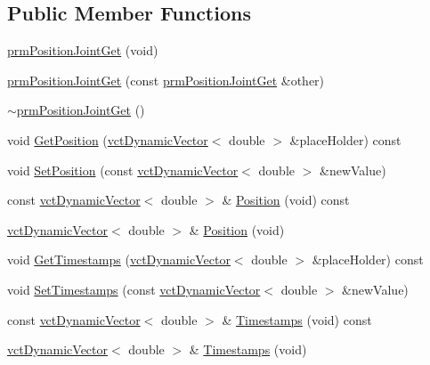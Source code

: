 \subsection*{Public Member Functions}
\begin{DoxyCompactItemize}
\item 
\hyperlink{classprm_position_joint_get_a69350009ebaba3339c0ec32b3aae6b7f}{prm\+Position\+Joint\+Get} (void)
\item 
\hyperlink{classprm_position_joint_get_a72c1c1f68659da9dbe32b7127515454e}{prm\+Position\+Joint\+Get} (const \hyperlink{classprm_position_joint_get}{prm\+Position\+Joint\+Get} \&other)
\item 
\hyperlink{classprm_position_joint_get_aabb4b6e77618eeab9dbf6d99fcae03ff}{$\sim$prm\+Position\+Joint\+Get} ()
\item 
void \hyperlink{classprm_position_joint_get_a83e71431f7e086cff80c7d905b734ada}{Get\+Position} (\hyperlink{classvct_dynamic_vector}{vct\+Dynamic\+Vector}$<$ double $>$ \&place\+Holder) const 
\item 
void \hyperlink{classprm_position_joint_get_a97b3fa06196951db95c14f397d05bc45}{Set\+Position} (const \hyperlink{classvct_dynamic_vector}{vct\+Dynamic\+Vector}$<$ double $>$ \&new\+Value)
\item 
const \hyperlink{classvct_dynamic_vector}{vct\+Dynamic\+Vector}$<$ double $>$ \& \hyperlink{classprm_position_joint_get_afc1c32503dade0821a035a42bf516f46}{Position} (void) const 
\item 
\hyperlink{classvct_dynamic_vector}{vct\+Dynamic\+Vector}$<$ double $>$ \& \hyperlink{classprm_position_joint_get_ae843013936bd6ceb74be7e5bda222f45}{Position} (void)
\item 
void \hyperlink{classprm_position_joint_get_a93c87fa32a3a893941b6943f399de3c9}{Get\+Timestamps} (\hyperlink{classvct_dynamic_vector}{vct\+Dynamic\+Vector}$<$ double $>$ \&place\+Holder) const 
\item 
void \hyperlink{classprm_position_joint_get_a59fbbf80a182141a7e74d509a7e06d00}{Set\+Timestamps} (const \hyperlink{classvct_dynamic_vector}{vct\+Dynamic\+Vector}$<$ double $>$ \&new\+Value)
\item 
const \hyperlink{classvct_dynamic_vector}{vct\+Dynamic\+Vector}$<$ double $>$ \& \hyperlink{classprm_position_joint_get_a90c9b7024463a9d8d53c183bd79c267d}{Timestamps} (void) const 
\item 
\hyperlink{classvct_dynamic_vector}{vct\+Dynamic\+Vector}$<$ double $>$ \& \hyperlink{classprm_position_joint_get_a0ab163bc7b0d4c38fb1653b6f1d1ae2a}{Timestamps} (void)

\end{DoxyCompactItemize}
